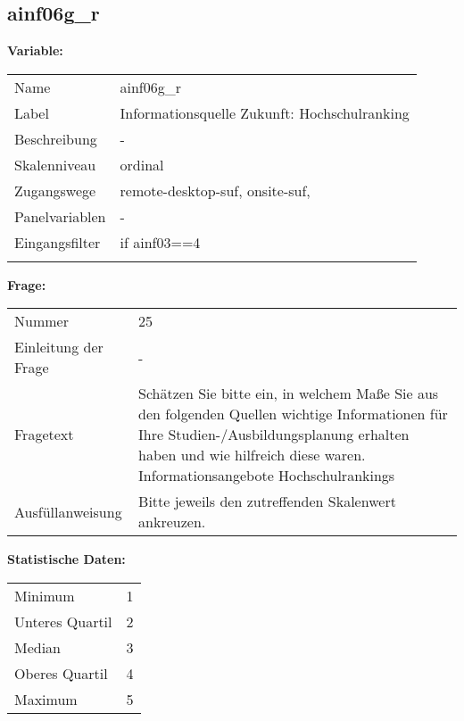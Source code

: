 	
	
	\subsection{ainf06g\_r}
	\label{subSection:ainf06g_r}

	\noindent\textbf{Variable:}\\
		\begin{tabular}{lL{11.3cm}}
			\label{tableVariable:ainf06g_r}
			Name & ainf06g\_r \\
			Label & Informationsquelle Zukunft: Hochschulranking \\
			Beschreibung & - \\
			Skalenniveau & ordinal \\
			Zugangswege &
				remote-desktop-suf,
				onsite-suf,
 \\
			Panelvariablen & -
			 \\
			Eingangsfilter & if ainf03==4 \\
 \\
		\end{tabular}

		\vspace*{1 cm}
		\noindent\textbf{Frage:}\\
		\begin{tabular}{lL{11.3cm}}
			\label{tableQuestion:ainf06g_r}
			Nummer & 25 \\
			Einleitung der Frage & - \\
			Fragetext & Schätzen Sie bitte ein, in welchem Maße Sie aus den folgenden Quellen wichtige Informationen für Ihre Studien-/Ausbildungsplanung erhalten haben und wie hilfreich diese waren.
Informationsangebote
Hochschulrankings \\
			Ausfüllanweisung & Bitte jeweils den zutreffenden Skalenwert ankreuzen. \\
		\end{tabular}


		\vspace*{1 cm}
		\noindent\textbf{Statistische Daten:}\\
			\begin{tabular}{ll}
				\label{tableStatistics:ainf06g_r}
					Minimum & 1 \\
					Unteres Quartil & 2 \\
					Median & 3 \\
					Oberes Quartil & 4 \\
					Maximum & 5 \\
			\end{tabular}




